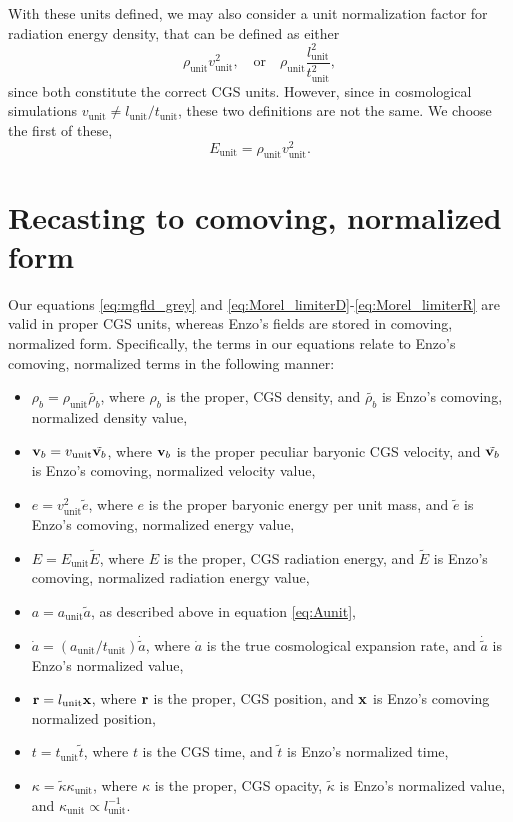 \documentclass[10pt]{article}
\renewcommand{\(}{\left(}
\renewcommand{\)}{\right)}
\newcommand{\vb}{{\bf v}_b}
\newcommand{\xvec}{{\bf x}}
\newcommand{\rvec}{{\bf r}}
\newcommand{\adot}{\dot{a}}
\newcommand{\rhob}{\rho_b}
\newcommand{\Aunit}{a_{\text{unit}}}
\newcommand{\Lunit}{l_{\text{unit}}}
\newcommand{\Dunit}{\rho_{\text{unit}}}
\newcommand{\Tunit}{t_{\text{unit}}}
\newcommand{\Vunit}{v_{\text{unit}}}
\newcommand{\Eunit}{E_{\text{unit}}}
\newcommand{\Kunit}{\kappa_{\text{unit}}}
\newcommand{\tK}{\tilde{\kappa}}
\newcommand{\tT}{\tilde{t}}
\newcommand{\tE}{\tilde{E}}
\newcommand{\tRho}{\tilde{\rhob}}
\newcommand{\tA}{\tilde{a}}
\begin{document}
With these units defined, we may also consider a unit normalization
factor for radiation energy density, that can be defined as either
\[
  \Dunit \Vunit^2, \quad\text{or}\quad 
  \Dunit \frac{\Lunit^2}{\Tunit^2},
\]
since both constitute the correct CGS units.  However, since in
cosmological simulations $\Vunit \ne \Lunit / \Tunit$, these two
definitions are not the same.  We choose the first of these,
\begin{equation}
  \label{eq:Eunit}
  \Eunit = \Dunit \Vunit^2.
\end{equation}




\section{Recasting to comoving, normalized form}
\label{sec:comoving_eqn}

Our equations \eqref{eq:mgfld_grey} and
\eqref{eq:Morel_limiterD}-\eqref{eq:Morel_limiterR}  
are valid in proper CGS units, whereas Enzo's fields are stored in
comoving, normalized form.  Specifically, the terms in our equations
relate to Enzo's comoving, normalized terms in the following manner:
\begin{itemize}
\item $\rhob = \Dunit \tRho$, where $\rhob$ is the proper, CGS
  density, and $\tRho$ is Enzo's comoving, normalized
  density value,
\item $\vb = \Vunit \tilde{\vb}$, where $\vb$ is the proper peculiar
  baryonic CGS velocity, and $\tilde{\vb}$ is Enzo's comoving,
  normalized velocity value,
\item $e = \Vunit^2 \tilde{e}$, where $e$ is the proper
  baryonic energy per unit mass, and $\tilde{e}$ is Enzo's comoving,
  normalized energy value,
\item $E = \Eunit \tE$, where $E$ is the proper, CGS radiation
  energy, and $\tE$ is Enzo's comoving, normalized
  radiation energy value,
\item $a = \Aunit \tA$, as described above in equation
  \eqref{eq:Aunit},
\item $\adot = \left(\Aunit/\Tunit\right) \dot{\tA}$, where $\adot$ is
  the true cosmological expansion rate, and $\dot{\tA}$ is Enzo's
  normalized value,
\item $\rvec = \Lunit \xvec$, where $\rvec$ is the
  proper, CGS position, and $\xvec$ is Enzo's comoving normalized position,
\item $t = \Tunit \tT$, where $t$ is the CGS time, and $\tT$ is Enzo's
  normalized time,
\item $\kappa = \tK \Kunit$, where $\kappa$ is the proper, CGS
  opacity, $\tK$ is Enzo's normalized value, and $\Kunit \propto
  \Lunit^{-1}$.
\end{itemize}
\end{document}
